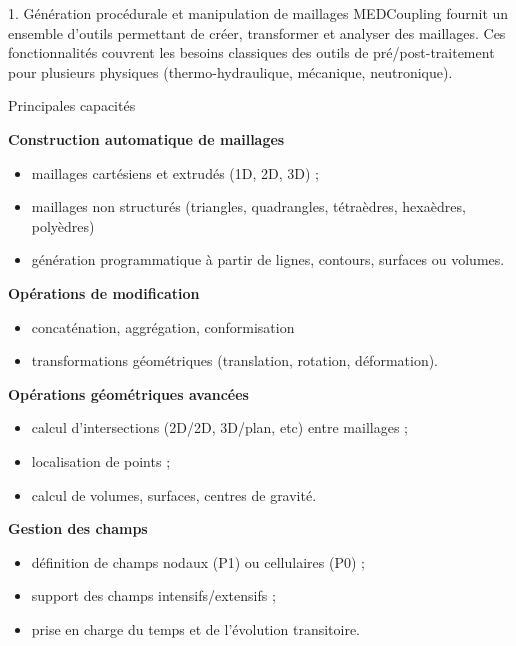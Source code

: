 \begin{frame}{1. Génération procédurale et manipulation de maillages}
\protect\hypertarget{guxe9nuxe9ration-procuxe9durale-et-manipulation-de-maillages}{}
MEDCoupling fournit un ensemble d'outils permettant de créer,
transformer et analyser des maillages. Ces fonctionnalités couvrent les
besoins classiques des outils de pré/post-traitement pour plusieurs
physiques (thermo-hydraulique, mécanique, neutronique).

\begin{block}{Principales capacités}
\protect\hypertarget{principales-capacituxe9s}{}
\begin{block}{\textbf{Construction automatique de maillages}}
\protect\hypertarget{construction-automatique-de-maillages}{}
\begin{itemize}
\tightlist
\item
  maillages cartésiens et extrudés (1D, 2D, 3D) ;
\item
  maillages non structurés (triangles, quadrangles, tétraèdres,
  hexaèdres, polyèdres)
\item
  génération programmatique à partir de lignes, contours, surfaces ou
  volumes.
\end{itemize}
\end{block}

\begin{block}{\textbf{Opérations de modification}}
\protect\hypertarget{opuxe9rations-de-modification}{}
\begin{itemize}
\tightlist
\item
  concaténation, aggrégation, conformisation
\item
  transformations géométriques (translation, rotation, déformation).
\end{itemize}
\end{block}

\begin{block}{\textbf{Opérations géométriques avancées}}
\protect\hypertarget{opuxe9rations-guxe9omuxe9triques-avancuxe9es}{}
\begin{itemize}
\tightlist
\item
  calcul d'intersections (2D/2D, 3D/plan, etc) entre maillages ;
\item
  localisation de points ;
\item
  calcul de volumes, surfaces, centres de gravité.
\end{itemize}
\end{block}

\begin{block}{\textbf{Gestion des champs}}
\protect\hypertarget{gestion-des-champs}{}
\begin{itemize}
\tightlist
\item
  définition de champs nodaux (P1) ou cellulaires (P0) ;
\item
  support des champs intensifs/extensifs ;
\item
  prise en charge du temps et de l'évolution transitoire.
\end{itemize}
\end{block}


\end{block}
\end{frame}
